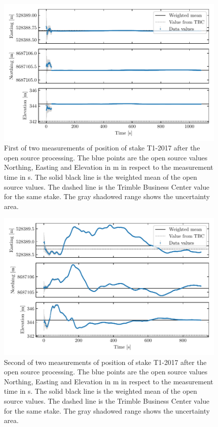 \begin{figure}[H]
    \centering
    \includegraphics[width=\textwidth]{./figs/timeseries/46250700_corr-T1-i-2017_Timeseries-east-north-elev.pdf}
    \caption{First of two measurements of position of stake T1-2017 after the open source processing. The blue points are the open source values Northing, Easting and Elevation in m in respect to the measurement time in s. The solid black line is the weighted mean of the open source values. The dashed line is the Trimble Business Center value for the same stake. The gray shadowed range shows the uncertainty area.}
    \label{GPS:fig:T1-i_timeseries}
\end{figure}

\begin{figure}[H]
    \centering
    \includegraphics[width=\textwidth]{./figs/timeseries/46250723_corr-T1-ii-2017_Timeseries-east-north-elev.pdf}
    \caption{Second of two measurements of position of stake T1-2017  after the open source processing. The blue points are the open source values Northing, Easting and Elevation in m in respect to the measurement time in s. The solid black line is the weighted mean of the open source values. The dashed line is the Trimble Business Center value for the same stake. The gray shadowed range shows the uncertainty area.}
    \label{GPS:fig:T1-ii_timeseries}
\end{figure}

